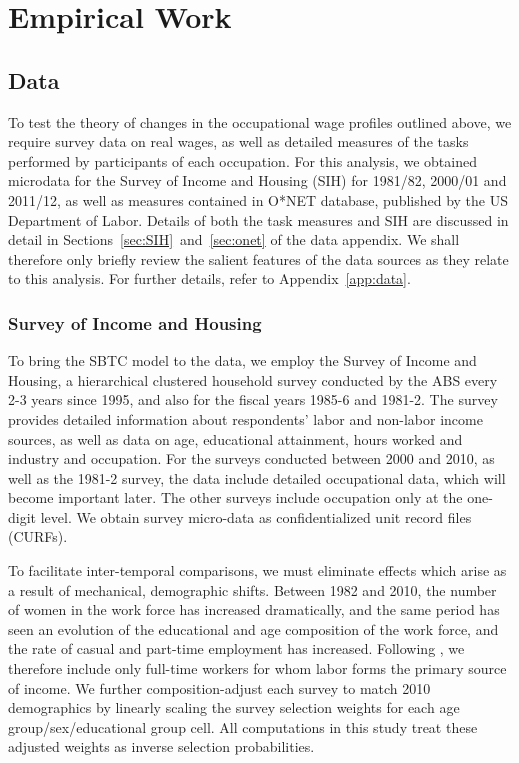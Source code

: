 \chapter{Empirical Work}\label{ch:4}

\section{Data}

To test the theory of changes in the occupational wage profiles outlined above, we require survey data on real wages, as well as detailed measures of the tasks performed by participants of each occupation. For this analysis, we obtained microdata for the Survey of Income and Housing (SIH) for 1981/82, 2000/01 and 2011/12, as well as measures contained in O*NET database, published by the US Department of Labor. Details of both the task measures and SIH are discussed in detail in Sections~\ref{sec:SIH}~and~\ref{sec:onet} of the data appendix. We shall therefore only briefly review the salient features of the data sources as they relate to this analysis. For further details, refer to Appendix~\ref{app:data}.

\subsection{Survey of Income and Housing}

To bring the SBTC model to the data, we employ the Survey of Income and Housing, a hierarchical clustered household survey conducted by the ABS every 2-3 years since 1995, and also for the fiscal years 1985-6 and 1981-2. The survey provides detailed  information about respondents' labor and non-labor income sources, as well as data on age, educational attainment, hours worked and industry and occupation. For the surveys conducted between 2000 and 2010, as well as the 1981-2 survey, the data include detailed occupational data, which will become important later. The other surveys include occupation only at the one-digit level. We obtain survey micro-data as confidentialized unit record files (CURFs).

To facilitate inter-temporal comparisons, we must eliminate effects which arise as a result of mechanical, demographic shifts. Between 1982 and 2010, the number of women in the work force has increased dramatically, and the same period has seen an evolution of the educational and age composition of the work force, and the rate of casual and part-time employment has increased. Following \citet{Acemoglu2011}, we therefore include only full-time workers for whom labor forms the primary source of income. We further composition-adjust each survey to match 2010 demographics by linearly scaling the survey selection weights for each age group/sex/educational group cell. All computations in this study treat these adjusted weights as inverse selection probabilities.


